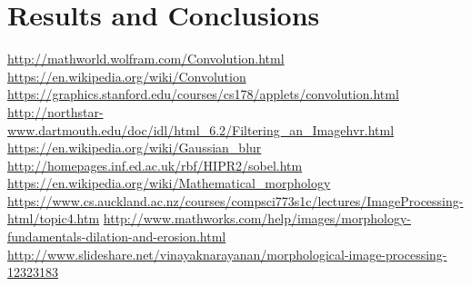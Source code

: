 \documentclass{article}
\begin{document}

\section{Results and Conclusions}


\newpage

\begin{thebibliography}{1}
	 \url{http://mathworld.wolfram.com/Convolution.html}
	 \url{https://en.wikipedia.org/wiki/Convolution}
	 \url{https://graphics.stanford.edu/courses/cs178/applets/convolution.html}
	 \url{http://northstar-www.dartmouth.edu/doc/idl/html_6.2/Filtering_an_Imagehvr.html}
	 \url{https://en.wikipedia.org/wiki/Gaussian_blur}
	 \url{http://homepages.inf.ed.ac.uk/rbf/HIPR2/sobel.htm}
	 \url{https://en.wikipedia.org/wiki/Mathematical_morphology}	
	 \url{https://www.cs.auckland.ac.nz/courses/compsci773s1c/lectures/ImageProcessing-html/topic4.htm}		
	 \url{http://www.mathworks.com/help/images/morphology-fundamentals-dilation-and-erosion.html}
	 \url{http://www.slideshare.net/vinayaknarayanan/morphological-image-processing-12323183}
	
\end{thebibliography}

\end{document}
